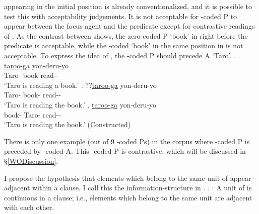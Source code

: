  appearing in the initial position is already conventionalized, and
it is possible to test this with acceptability judgements.
It is not acceptable for -coded P to appear between the focus agent and the predicate except for contrastive readings of .
As the contrast between \Next[a-c] shows,
the zero-coded P  `book' in \Next[a] right before the predicate is acceptable,
while the -coded  `book' in the same position in \Next[b] is not acceptable.
To express the idea of \Next[b],
the -coded P should precede A  `Taro'.
%
\ex. \ag. \ul{taroo-ga}  yon-deru-yo \\
		Taro- book read-- \\
		`Taro is reading a book.'
	\bg. ??\ul{taroo-ga}  yon-deru-yo \\
		Taro- book- read-- \\
		`Taro is reading the book.'
	\bg.  \ul{taroo-ga} yon-deru-yo \\
		book- Taro- read-- \\
		`Taro is reading the book.'
		\hfill{(Constructed)}

There is only one example (out of 9 -coded Ps) in the corpus
where -coded P is preceded by -coded A.
This -coded P is contrastive, which will be discussed in \S \ref{WODiscussion}.

I propose the hypothesis that elements which belong to the same unit of  appear adjacent within a clause.
I call this the information-structure  in .
%
\ex. \label{IScontinuityP}:
 A unit of  is continuous in a clause;
 i.e., elements which belong to the same unit are adjacent with each other.

